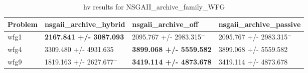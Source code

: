 \begin{table}
\caption{hv results for NSGAII_archive_family_WFG}
\label{NSGAII_archive_family_WFG_hv}
\begin{tabular}{llll}
\toprule
Problem & nsgaii_archive_hybrid & nsgaii_archive_off & nsgaii_archive_passive \\
\midrule
wfg1 & \textbf{2167.841 +/- 3087.093} & 2095.767 +/- 2983.315$^{-}$ & 2095.767 +/- 2983.315$^{-}$ \\
wfg4 & 3309.480 +/- 4931.635 & \textbf{3899.068 +/- 5559.582} & 3899.068 +/- 5559.582 \\
wfg9 & 1819.163 +/- 2627.677$^{-}$ & \textbf{3419.114 +/- 4873.678} & 3419.114 +/- 4873.678 \\
\bottomrule
\end{tabular}
\end{table}
